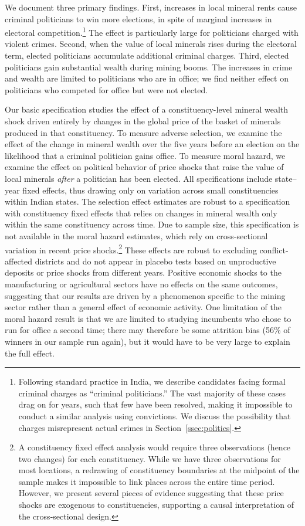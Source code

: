 \documentclass[12pt,letterpaper]{article}
\begin{document}
We document three primary findings. First, increases in local mineral
rents cause criminal politicians to win more elections, in spite of
marginal increases in electoral competition.\footnote{Following
  standard practice in India, we describe candidates facing formal
  criminal charges as ``criminal politicians.'' The vast majority of
  these cases drag on for years, such that few have been resolved,
  making it impossible to conduct a similar analysis using
  convictions. We discuss the possibility that charges misrepresent
  actual crimes in Section~\ref{ssec:politics}.} The effect is
particularly large for politicians charged with violent crimes.
Second, when the value of local minerals rises during the electoral
term, elected politicians accumulate additional criminal
charges. Third, elected politicians gain substantial wealth during
mining booms.  The increases in crime and wealth are limited to
politicians who are in office; we find neither effect on politicians who
competed for office but were not elected.

Our basic specification studies the effect of a constituency-level
mineral wealth shock driven entirely by changes in the global price of
the basket of minerals produced in that constituency. To measure
adverse selection, we examine the effect of the change in mineral
wealth over the five years before an election on the likelihood that a
criminal politician gains office. To measure moral hazard, we examine
the effect on political behavior of price shocks that raise the value
of local minerals \textit{after} a politician has been elected.  All
specifications include state--year fixed effects, thus drawing only on
variation across small constituencies within Indian states. The
selection effect estimates are robust to a specification with
constituency fixed effects that relies on changes in mineral wealth
only within the same constituency across time. Due to sample size,
this specification is not available in the moral hazard estimates,
which rely on cross-sectional variation in recent price
shocks.\footnote{A constituency fixed effect analysis would require
  three observations (hence two changes) for each constituency. While
  we have three observations for most locations, a redrawing of
  constituency boundaries at the midpoint of the sample makes it
  impossible to link places across the entire time period. However, we
  present several pieces of evidence suggesting that these price
  shocks are exogenous to constituencies, supporting a causal
  interpretation of the cross-sectional design.} These effects are
robust to excluding conflict-affected districts and do not
appear in placebo tests based on unproductive deposits or price
shocks from different years. Positive economic shocks to the
manufacturing or agricultural sectors have no effects on the same
outcomes, suggesting that our results are driven by a phenomenon
specific to the mining sector rather than a general effect of economic
activity. One limitation of the moral hazard result is that we are limited to studying incumbents who chose to run for office a second time; there may therefore be some attrition bias (56\% of winners in our sample run again), but it would have to be very large to explain the full effect.
\end{document}
